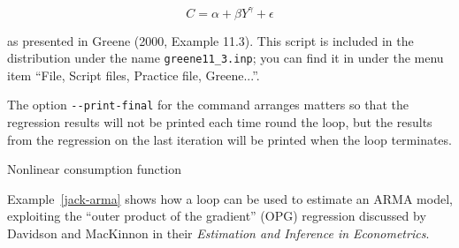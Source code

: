 \[ C = \alpha + \beta Y^{\gamma} + \epsilon \]

as presented in Greene (2000, Example 11.3).  This script is included
in the  distribution under the name \verb+greene11_3.inp+;
you can find it in  under the menu item ``File, Script files,
Practice file, Greene...''.

The option \verb+--print-final+ for the  command arranges
matters so that the regression results will not be printed each time
round the loop, but the results from the regression on the last
iteration will be printed when the loop terminates.

\begin{script}[htbp]
  \caption{Nonlinear consumption function}
  \label{greene-ils-script}
\end{script}

Example~\ref{jack-arma} shows how a loop can be used to
estimate an ARMA model, exploiting the ``outer product of the
gradient'' (OPG) regression discussed by Davidson and MacKinnon in
their \emph{Estimation and Inference in Econometrics}.

